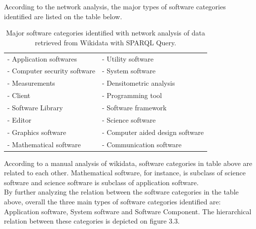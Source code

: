 \noindent According to the network analysis, the major types of software categories identified are listed on the table below.
\\
\begin{table}[h!]
	\begin{center}
		\caption{Major software categories identified with network analysis of data retrieved from Wikidata with SPARQL Query.}
		\label{tab:table1}
		\begin{tabular}{|l|l|} %
			
			\hline
			- Application softwares & -	Utility software  \\
			- Computer security software & - System software \\
			- Measurements   & - Densitometric analysis \\
			- Client       & - Programming tool   \\
			- Software Library        & - Software framework  \\
			- Editor  & - Science software     \\
			- Graphics software     & - Computer aided design software \\
			- Mathematical software          & - Communication software \\
			\hline
		\end{tabular}
	\end{center}
\end{table}

According to a manual analysis of wikidata, software categories in table above are related to each other. Mathematical software, for instance, is subclass of science software and science software is subclass of application software. \\

By further analyzing the relation between the software categories in the table above, overall the three main types of software categories identified are:  Application software, System software and Software Component. The hierarchical relation between these categories is depicted on figure 3.3. 

